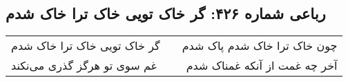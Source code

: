 \begin{center}
\section*{رباعی شماره ۴۲۶: گر خاک تویی خاک ترا خاک شدم}
\label{sec:sh426}
\begin{longtable}{l p{0.5cm} r}
گر خاک تویی خاک ترا خاک شدم
&&
چون خاک ترا خاک شدم پاک شدم
\\
غم سوی تو هرگز گذری می‌نکند
&&
آخر چه غمت از آنکه غمناک شدم
\\
\end{longtable}
\end{center}
